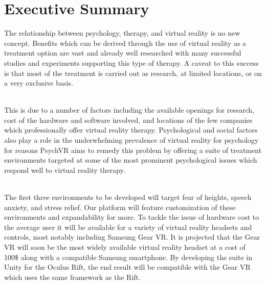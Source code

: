 \documentclass[a4paper,10pt,twoside]{article}
\begin{document}
\section{Executive Summary}
The relationship between psychology, therapy, and virtual reality is no new concept. Benefits which can be derived through the use of virtual reality as a treatment option are vast 
and already well researched with many successful studies and experiments supporting this type of therapy. A caveat to this success is that most of the treatment is carried out as research, 
at limited locations, or on a very exclusive basis.
\par~\\ 
This is due to a number of factors including the available openings for research, cost of the hardware and software involved, and locations
of the few companies which professionally offer virtual reality therapy. Psychological and social factors also play a role in the underwhelming prevalence of virtual reality for psychology for 
reasons PsychVR aims to remedy this problem by offering a suite of treatment environments targeted at some of the most prominent psychological issues which respond well to virtual reality therapy.
\par ~\\
The first three environments to be developed will target fear of heights, speech anxiety, and stress relief. Our platform will feature customization of these environments and expandability for more.
To tackle the issue of hardware cost to the average user it will be available for a variety of virtual reality headsets and controls, most notably including Samsung Gear VR. It is projected that the 
Gear VR will soon be the most widely available virtual reality headset at a cost of 100\$ along with a compatible Samsung smartphone. By developing the suite in Unity for the Oculus Rift, the end result
will be compatible with the Gear VR which uses the same framework as the Rift.
\pagebreak
\end{document}
